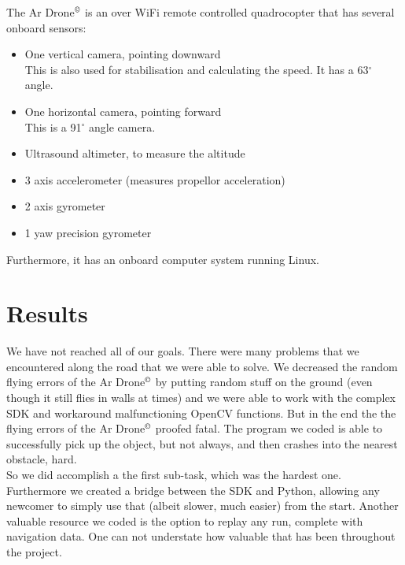 \documentclass[a4paper,10pt]{article}
\newcommand{\Ardrone}{Ar Drone$^{\copyright}$ }
\begin{document}
The \Ardrone is an over WiFi remote controlled quadrocopter that has several onboard sensors:
\begin{itemize}
	\item One vertical camera, pointing downward \\ This is also used for stabilisation and calculating the speed. It has a 63$^{\circ}$ angle.
	\item One horizontal camera, pointing forward \\ This is a 91$^{\circ}$ angle camera.
	\item Ultrasound altimeter, to measure the altitude
    \item 3 axis accelerometer (measures propellor acceleration)
    \item 2 axis gyrometer 
    \item 1 yaw precision gyrometer
\end{itemize}
Furthermore, it has an onboard computer system running Linux. 





\section{Results}
We have not reached all of our goals. There were many problems that we encountered along the road that we were able to solve. We decreased the random flying errors
of the \Ardrone by putting random stuff on the ground (even though it still flies in walls at times) and we were able to work with the complex SDK and workaround
malfunctioning OpenCV functions. But in the end the the flying errors of the \Ardrone proofed fatal. The program we coded is able to successfully pick up the object,
but not always, and then crashes into the nearest obstacle, hard. \\

So we did accomplish a the first sub-task, which was the hardest one. Furthermore we created a bridge between the SDK and Python, allowing any newcomer to simply use 
that (albeit slower, much easier) from the start. Another valuable resource we coded is the option to replay any run, complete with navigation data. One can not understate
how valuable that has been throughout the project. \\
\end{document}
